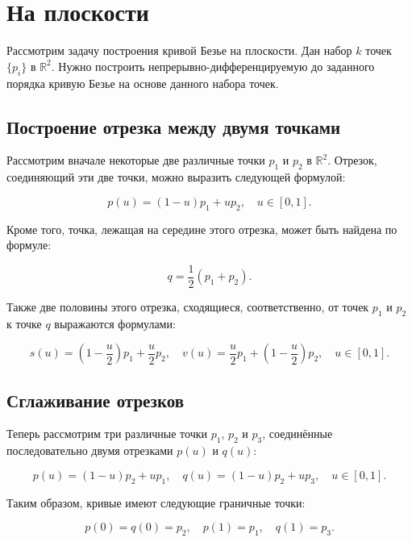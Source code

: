 \section{На плоскости}

Рассмотрим задачу построения кривой Безье на плоскости. Дан набор $k$ точек $\{p_i\}$ в $\mathbb{R}^2$.
Нужно построить непрерывно-дифференци\-руемую до заданного порядка кривую Безье на основе данного набора точек.

\subsection*{Построение отрезка между двумя точками}

Рассмотрим вначале некоторые две различные точки $p_1$ и $p_2$ в $\mathbb{R}^2$. Отрезок, соединяющий эти две точки,
можно выразить следующей формулой:

\begin{equation}
p(u)=(1-u)p_1+up_2, \quad u \in [0,1].
\label{plane-segment}
\end{equation}

Кроме того, точка, лежащая на середине этого отрезка, может быть найдена по формуле:

\begin{equation}
q=\frac{1}{2}(p_1+p_2).
\label{plane-segment-mid}
\end{equation}

Также две половины этого отрезка, сходящиеся, соответственно, от точек $p_1$ и $p_2$ к точке $q$ выражаются формулами:

\begin{equation}
s(u)=(1-\frac{u}{2})p_1+\frac{u}{2}p_2, \quad v(u)=\frac{u}{2}p_1+(1-\frac{u}{2})p_2, \quad u \in [0,1].
\label{plane-segment-halfs}
\end{equation}

\subsection*{Сглаживание отрезков}

Теперь рассмотрим три различные точки $p_1$, $p_2$ и $p_3$, соединённые последовательно двумя отрезками $p(u)$ и $q(u)$:

$$
p(u)=(1-u)p_2+up_1, \quad q(u)=(1-u)p_2+up_3, \quad u \in [0,1].
$$

Таким образом, кривые имеют следующие граничные точки:

$$
p(0)=q(0)=p_2, \quad p(1)=p_1, \quad q(1)=p_3.
$$

